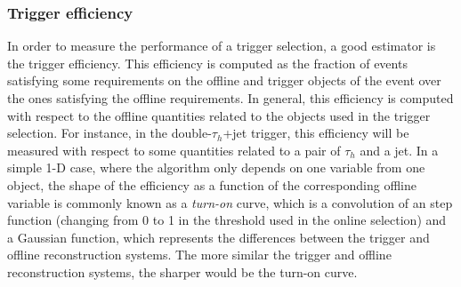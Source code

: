 \documentclass[../main.tex]{subfiles}
\begin{document}
\subsubsection{Trigger efficiency}

In order to measure the performance of a trigger selection, a good estimator is the trigger efficiency. This efficiency is computed as the fraction of events satisfying some requirements on the offline and trigger objects of the event over the ones satisfying the offline requirements. In general, this efficiency is computed with respect to the offline quantities related to the objects used in the trigger selection. For instance, in the double-$\tau_h$+jet trigger, this efficiency will be measured with respect to some quantities related to a pair of $\tau_h$ and a jet. In a simple 1-D case, where the algorithm only depends on one variable from one object, the shape of the efficiency as a function of the corresponding offline variable is commonly known as a \textit{turn-on} curve, which is a convolution of an step function (changing from 0 to 1 in the threshold used in the online selection) and a Gaussian function, which represents the differences between the trigger and offline reconstruction systems. The more similar the trigger and offline reconstruction systems, the sharper would be the turn-on curve.
\end{document}
